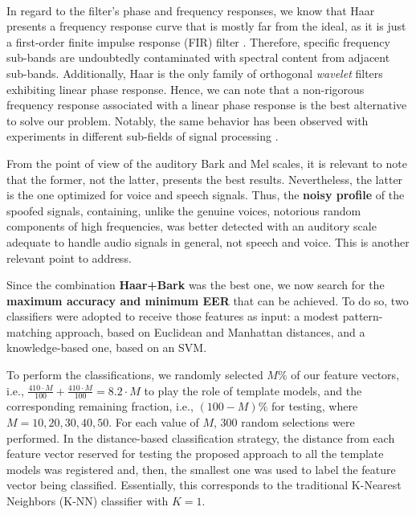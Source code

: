 	\\
	\par In regard to the filter's phase and frequency responses, we know that Haar presents a frequency response curve that is mostly far from the ideal, as it is just a first-order finite impulse response (FIR) filter \cite{WaveletPropertiesBrowser}. Therefore, specific frequency sub-bands are undoubtedly contaminated with spectral content from adjacent sub-bands. Additionally, Haar is the only family of orthogonal \textit{wavelet} filters exhibiting linear phase response. Hence, we can note that a non-rigorous frequency response associated with a linear phase response is the best alternative to solve our problem. Notably, the same behavior has been observed with experiments in different sub-fields of signal processing \cite{guido2}\cite{guido3}\cite{guido4}. 
	\\
	\par From the point of view of the auditory Bark and Mel scales, it is relevant to note that the former, not the latter, presents the best results. Nevertheless, the latter is the one optimized for voice and speech signals. Thus, the \textbf{noisy profile} of the spoofed signals, containing, unlike the genuine voices, notorious random components of high frequencies, was better detected with an auditory scale adequate to handle audio signals in general, not speech and voice. This is another relevant point to address. 
	
	
	
	\par Since the combination \textbf{Haar+Bark} was the best one, we now search for the \textbf{maximum accuracy and minimum EER} that can be achieved. To do so, two classifiers were adopted to receive those features as input: a modest pattern-matching approach, based on Euclidean and Manhattan distances, and a knowledge-based one, based on an SVM. 
	\\
	\par To perform the classifications, we randomly selected $M\%$ of our feature vectors, i.e., $\frac{410 \cdot M}{100} + \frac{410 \cdot M}{100} = 8.2 \cdot M$ to play the role of template models, and the corresponding remaining fraction, i.e., $(100-M)\%$ for testing, where $M=10, 20, 30, 40, 50$. For each value of $M$, 300 random selections were performed. In the distance-based classification strategy, the distance from each feature vector reserved for testing the proposed approach to all the template models was registered and, then, the smallest one was used to label the feature vector being classified. Essentially, this corresponds to the traditional K-Nearest Neighbors (K-NN) classifier with $K=1$.     

